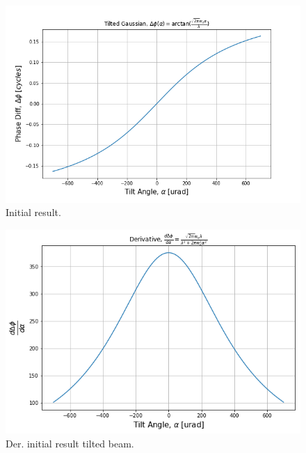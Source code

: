 \documentclass[aps,twoside,secnumarabic,balancelastpage,amsmath,amssymb,nofootinbib,hyperref=pdftex]{revtex4}
\begin{document}
\begin{figure}
	\centering
		\includegraphics[scale=.65]{tilt-initial}
		\caption{Initial result.}
		\label{fig:5}
\end{figure}


\begin{figure}
	\centering
		\includegraphics[scale=.65]{tilt-initial-der}
		\caption{Der. initial result tilted beam.}
		\label{fig:6}
\end{figure}

\clearpage
\end{document}
